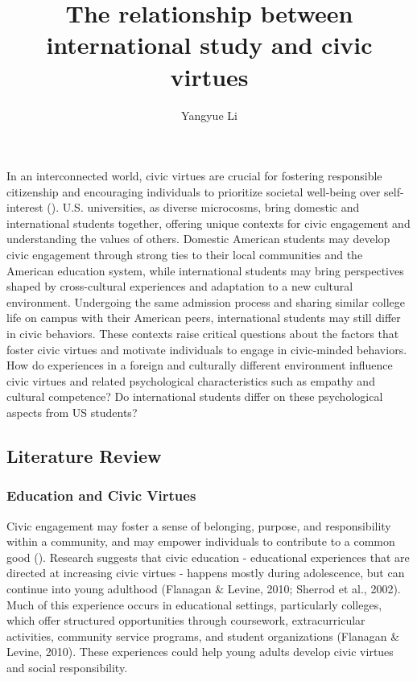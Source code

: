 \documentclass[
  man,
  floatsintext,
  longtable,
  nolmodern,
  notxfonts,
  notimes,
  colorlinks=true,linkcolor=blue,citecolor=blue,urlcolor=blue]{apa7}
\title{The relationship between international study and civic virtues}
\author{Yangyue Li}
\affiliation{
{MA Program in the Social Sciences, University of Chicago}}
\begin{document}
\maketitle


\setcounter{secnumdepth}{-\maxdimen} %

\setlength\LTleft{0pt}


In an interconnected world, civic virtues are crucial for fostering
responsible citizenship and encouraging individuals to prioritize
societal well-being over self-interest
(). U.S. universities, as diverse microcosms, bring domestic
and international students together, offering unique contexts for civic
engagement and understanding the values of others. Domestic American
students may develop civic engagement through strong ties to their local
communities and the American education system, while international
students may bring perspectives shaped by cross-cultural experiences and
adaptation to a new cultural environment. Undergoing the same admission
process and sharing similar college life on campus with their American
peers, international students may still differ in civic behaviors. These
contexts raise critical questions about the factors that foster civic
virtues and motivate individuals to engage in civic-minded behaviors.
How do experiences in a foreign and culturally different environment
influence civic virtues and related psychological characteristics such
as empathy and cultural competence? Do international students differ on
these psychological aspects from US students?

\subsection{Literature Review}\label{literature-review}

\subsubsection{Education and Civic
Virtues}\label{education-and-civic-virtues}

Civic engagement may foster a sense of belonging, purpose, and
responsibility within a community, and may empower individuals to
contribute to a common good
(). Research suggests that civic education - educational
experiences that are directed at increasing civic virtues - happens
mostly during adolescence, but can continue into young adulthood
(Flanagan \& Levine, 2010; Sherrod et al., 2002). Much of this
experience occurs in educational settings, particularly colleges, which
offer structured opportunities through coursework, extracurricular
activities, community service programs, and student organizations
(Flanagan \& Levine, 2010). These experiences could help young adults
develop civic virtues and social responsibility.
\end{document}
